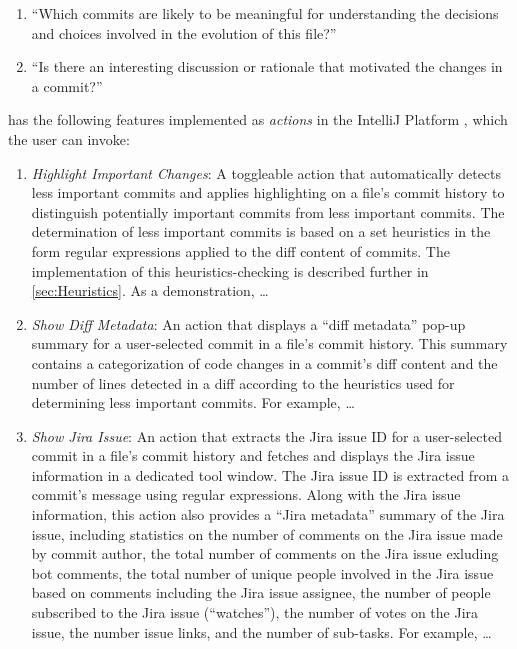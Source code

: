 \begin{enumerate}[label={(\arabic*)}]
    \item ``Which commits are likely to be meaningful for understanding the decisions and choices involved in the evolution of this file?''
    \item ``Is there an interesting discussion or rationale that motivated the changes in a commit?''
\end{enumerate}

 has the following features implemented as \emph{actions} in the IntelliJ Platform , which the user can invoke:

\begin{enumerate}[label=(\Alph*)]
    \item \textit{Highlight Important Changes}: A toggleable action that automatically detects less important commits and applies highlighting on a file's commit history to distinguish potentially important commits from less important commits. The determination of less important commits is based on a set heuristics in the form regular expressions applied to the diff content of commits. The implementation of this heuristics-checking is described further in \autoref{sec:Heuristics}. As a demonstration, \dots {}
    \item \textit{Show Diff Metadata}: An action that displays a ``diff metadata'' pop-up summary for a user-selected commit in a file's commit history. This summary contains a categorization of code changes in a commit's diff content and the number of lines detected in a diff according to the heuristics used for determining less important commits. For example, \dots {}
    \item \textit{Show Jira Issue}: An action that extracts the Jira issue ID for a user-selected commit in a file's commit history and fetches and displays the Jira issue information in a dedicated tool window. The Jira issue ID is extracted from a commit's message using regular expressions. Along with the Jira issue information, this action also provides a ``Jira metadata'' summary of the Jira issue, including statistics on the number of comments on the Jira issue made by commit author, the total number of comments on the Jira issue exluding bot comments, the total number of unique people involved in the Jira issue based on comments including the Jira issue assignee, the number of people subscribed to the Jira issue (``watches''), the number of votes on the Jira issue, the number issue links, and the number of sub-tasks. For example, \dots {}
\end{enumerate}

